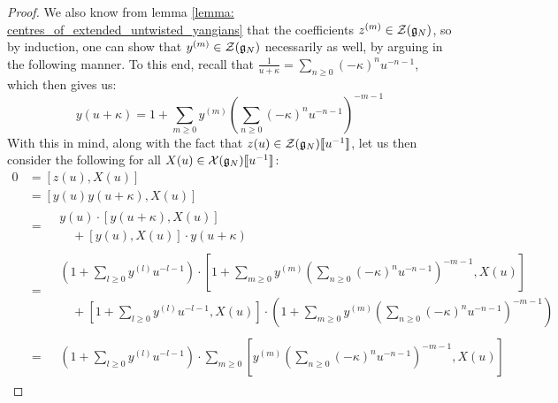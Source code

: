 \begin{proof}
                    We also know from lemma \ref{lemma: centres_of_extended_untwisted_yangians} that the coefficients $z^{(m)} \in \calZ(\g_N)$, so by induction, one can show that $y^{(m)} \in \calZ(\g_N)$ necessarily as well, by arguing in the following manner. To this end, recall that $\frac{1}{u + \kappa} = \sum_{n \geq 0} (-\kappa)^n u^{-n - 1}$, which then gives us:
                        $$y(u + \kappa) = 1 + \sum_{m \geq 0} y^{(m)} \left( \sum_{n \geq 0} (-\kappa)^n u^{-n - 1} \right)^{-m - 1}$$
                    With this in mind, along with the fact that $z(u) \in \calZ(\g_N)[\![u^{-1}]\!]$, let us then consider the following for all $X(u) \in \calX(\g_N)[\![u^{-1}]\!]$:
                        $$
                            \begin{aligned}
                                0 & = [z(u), X(u)]
                                \\
                                & = [y(u) y(u + \kappa), X(u)]
                                \\
                                & =
                                \begin{aligned}
                                    & y(u) \cdot [y(u + \kappa), X(u)]
                                    \\
                                    & \quad + [y(u), X(u)] \cdot y(u + \kappa)
                                \end{aligned}
                                \\
                                & =
                                \begin{aligned}
                                    & \left( 1 + \sum_{l \geq 0} y^{(l)} u^{-l - 1} \right) \cdot \left[ 1 + \sum_{m \geq 0} y^{(m)} \left( \sum_{n \geq 0} (-\kappa)^n u^{-n - 1} \right)^{-m - 1}, X(u) \right]
                                    \\
                                    & \quad + \left[ 1 + \sum_{l \geq 0} y^{(l)} u^{-l - 1}, X(u) \right] \cdot \left( 1 + \sum_{m \geq 0} y^{(m)} \left( \sum_{n \geq 0} (-\kappa)^n u^{-n - 1} \right)^{-m - 1} \right) 
                                \end{aligned}
                                \\
                                & =
                                \begin{aligned}
                                    & \left( 1 + \sum_{l \geq 0} y^{(l)} u^{-l - 1} \right) \cdot \sum_{m \geq 0} \left[ y^{(m)} \left( \sum_{n \geq 0} (-\kappa)^n u^{-n - 1} \right)^{-m - 1}, X(u) \right]

\end{aligned}
\end{aligned}$$
\end{proof}
